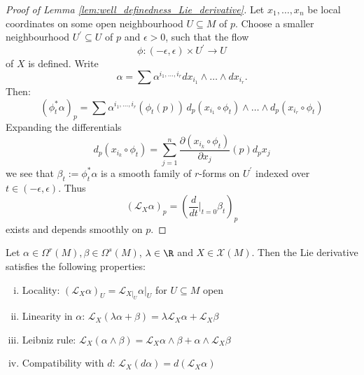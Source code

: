 \begin{proof}[Proof of Lemma \ref{lem:well_definedness_Lie_derivative}]
    Let $x_1,\ldots,x_n$ be local coordinates on some open neighbourhood $U \subseteq M$ of $p$. Choose a smaller neighbourhood $U^\prime \subseteq U$ of $p$ and $\epsilon > 0$, such that the flow
    \[
    \phi \colon (-\epsilon,\epsilon) \times U^\prime \to U
    \]
    of $X$ is defined. Write
    \[
        \alpha = \sum \alpha^{i_1,\ldots,i_r}dx_{i_1} \wedge \ldots \wedge dx_{i_r}.
    \]
    Then:
    \[
        (\phi_t^\ast\alpha)_p = \sum \alpha^{i_1,\ldots,i_r}(\phi_t(p)) \,d_p(x_{i_1} \circ \phi_t) \wedge \ldots \wedge d_p(x_{i_r} \circ \phi_t)
    \]
    Expanding the differentials 
    \[
        d_p(x_{i_k} \circ \phi_t) = \sum_{j=1}^n \frac{\partial(x_{i_k} \circ \phi_t)}{\partial x_j}(p) d_px_j
    \]
    we see that $\beta_t := \phi_t^\ast \alpha$ is a smooth family of $r$-forms on $U^\prime$ indexed over $t \in (-\epsilon,\epsilon)$. Thus
    \[
    (\mathcal{L}_X \alpha)_p = \left(\frac{d}{dt}\bigg|_{t=0} \beta_t\right)_p
    \]
    exists and depends smoothly on $p$.

\end{proof}

\begin{proposition}
    \label{prop:lie_derivative_properties}
    Let $\alpha \in \Omega^r(M), \beta \in \Omega^s(M)$, $\lambda \in \R$ and $X \in \mathscr{X}(M)$. Then the Lie derivative satisfies the following properties:
    \begin{enumerate}[(i)]
        \item Locality: $(\mathcal{L}_X \alpha)_U = \mathcal{L}_{X|_U} \alpha|_U$ for $U \subseteq M$ open
        \item Linearity in $\alpha$: $\mathcal{L}_X(\lambda \alpha + \beta) = \lambda \mathcal{L}_X \alpha + \mathcal{L}_X \beta$
        \item Leibniz rule: $\mathcal{L}_X(\alpha \wedge \beta) = \mathcal{L}_X \alpha \wedge \beta + \alpha \wedge \mathcal{L}_X \beta$
        \item Compatibility with $d$: $\mathcal{L}_X(d\alpha) = d(\mathcal{L}_X\alpha)$
    \end{enumerate}
\end{proposition}

